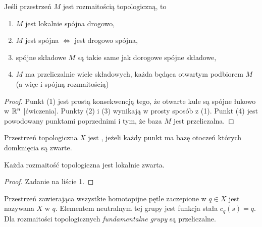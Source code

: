\begin{remark}
Jeśli przestrzeń $M$ jest rozmaitością topologiczną, to
\begin{enumerate}
    \item $M$ jest lokalnie spójna drogowo,
    \item $M$ jest spójna $\iff$ jest drogowo spójna,
    \item spójne składowe $M$ są takie same jak dorogowe spójne składowe,
    \item $M$ ma przeliczalnie wiele składowych, każda będąca otwartym podbiorem $M$ (a więc i spójną rozmaitością)
\end{enumerate}
\begin{proof}
    Punkt (1) jest prostą konsekwencją tego, że otwarte kule są spójne łukowo w $\mathbb{R}^n$ [ćwiczenia]. Punkty (2) i (3) wynikają w prosty sposób z (1). Punkt (4) jest powodowany punktami poprzednimi i tym, że baza $M$ jest przeliczalna. 
\end{proof}
\end{remark}

Przestrzeń topologiczna $X$ jest , jeżeli każdy punkt ma bazę otoczeń których domknięcia są zwarte.

\begin{remark}
Każda rozmaitość topologiczna jest lokalnie zwarta.
\begin{proof}
    Zadanie na liście 1.
\end{proof}
\end{remark}

Przestrzeń zawierająca wszystkie homotopijne pętle zaczepione w $q\in X$ jest nazywana  $X$ w $q$. Elementem neutralnym tej grupy jest funkcja stała $c_q(s)=q$. Dla rozmaitości topologicznych \emph{fundamentalne grupy} są przeliczalne.

